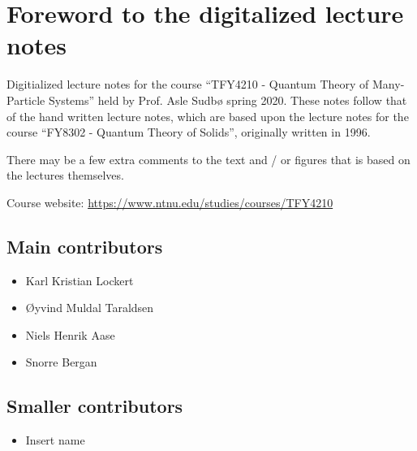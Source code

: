 \section*{Foreword to the digitalized lecture notes}

Digitialized lecture notes for the course ``TFY4210 - Quantum Theory of Many-Particle Systems'' held by Prof. Asle Sudbø spring 2020. These notes follow that of the hand written lecture notes, which are based upon the lecture notes for the course ``FY8302 - Quantum Theory of Solids'', originally written in 1996. 

There may be a few extra comments to the text and / or figures that is based on the lectures themselves. 


Course website: \href{https://www.ntnu.edu/studies/courses/TFY4210}{https://www.ntnu.edu/studies/courses/TFY4210}



\subsection*{Main contributors}
	\begin{multicols}{2}
\begin{itemize} 
	\item Karl Kristian Lockert
	\item Øyvind Muldal Taraldsen
	\item Niels Henrik Aase
	\item Snorre Bergan
\end{itemize}
\end{multicols}

\subsection*{Smaller contributors}
\begin{multicols}{2}
\begin{itemize}
	\item {\color{red} Insert name}
\end{itemize}
\end{multicols}

